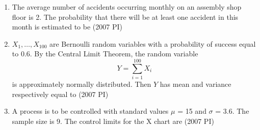 \begin{enumerate}[label=\thesubsection.\arabic*,ref=\thesubsection.\theenumi]
\hfill (2007 PI)
            \begin{enumerate}
            \end{enumerate}
\item 
The average number of accidents occurring monthly on an assembly shop floor is 2.
The probability that there will be at least one accident in this month is estimated to be
\hfill (2007 PI)
\begin{enumerate}
\end{enumerate}
\item 
$X_1, \ldots, X_{100}$ are Bernoulli random variables with a probability of success equal to $0.6$.  
By the Central Limit Theorem, the random variable  
\[
Y = \sum_{i=1}^{100} X_i\]
is approximately normally distributed. Then $Y$ has mean and variance respectively equal to 
\hfill (2007 PI)
\begin{enumerate}
    \end{enumerate}
%
\item 
A process is to be controlled with standard values $\mu$
 = 15 and $\sigma$
 = 3.6. The sample size is 9. The control limits for the X chart are
 \hfill (2007 PI)
\begin{enumerate}
\end{enumerate}
\end{enumerate}
